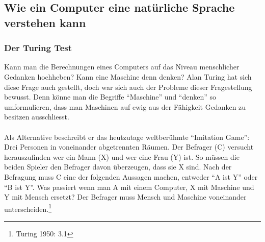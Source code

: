 \documentclass[a4paper,10pt]{article}
\begin{document}
\subsection{Wie ein Computer eine natürliche Sprache verstehen kann}
\subsubsection{Der Turing Test}
Kann man die Berechnungen eines Computers auf das Niveau menschlicher Gedanken hochheben? Kann eine Maschine denn denken? Alan Turing hat sich diese Frage auch gestellt, doch war sich auch der Probleme dieser Fragestellung bewusst. Denn könne man die Begriffe \enquote{Maschine} und \enquote{denken} so umformulieren, dass man Maschinen auf ewig aus der Fähigkeit Gedanken zu besitzen ausschliesst.\\
\\
Als Alternative beschreibt er das heutzutage weltberühmte \enquote{Imitation Game}:
Drei Personen in voneinander abgetrennten Räumen. Der Befrager (C) versucht herauszufinden wer ein Mann (X) und wer eine Frau (Y) ist. So müssen die beiden Spieler den Befrager davon überzeugen, dass sie X sind. Nach der Befragung muss C eine der folgenden Aussagen machen, entweder \enquote{A ist Y} oder \enquote{B ist Y}. Was passiert wenn man A mit einem Computer, X mit Maschine und Y mit Mensch ersetzt? Der Befrager muss Mensch und Maschine voneinander unterscheiden.\footnote{Turing 1950: 3.1} \\
\end{document}
